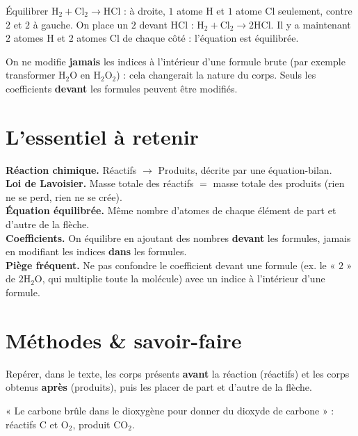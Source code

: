 \begin{exemple}
Équilibrer $\mathrm{H_2}+\mathrm{Cl_2}\to\mathrm{HCl}$ : à droite, $1$ atome H et $1$
atome Cl seulement, contre $2$ et $2$ à gauche. On place un $2$ devant $\mathrm{HCl}$ :
$\mathrm{H_2}+\mathrm{Cl_2}\to2\mathrm{HCl}$. Il y a maintenant $2$ atomes H et $2$ atomes
Cl de chaque côté : l'équation est équilibrée.
\end{exemple}

\begin{remarque}
On ne modifie \textbf{jamais} les indices à l'intérieur d'une formule brute (par exemple
transformer $\mathrm{H_2O}$ en $\mathrm{H_2O_2}$) : cela changerait la nature du corps.
Seuls les coefficients \textbf{devant} les formules peuvent être modifiés.
\end{remarque}

\section{L'essentiel à retenir}

\begin{synthese}
\textbf{Réaction chimique.} Réactifs $\to$ Produits, décrite par une équation-bilan.\\[4pt]
\textbf{Loi de Lavoisier.} Masse totale des réactifs $=$ masse totale des produits (rien
ne se perd, rien ne se crée).\\[4pt]
\textbf{Équation équilibrée.} Même nombre d'atomes de chaque élément de part et d'autre de
la flèche.\\[4pt]
\textbf{Coefficients.} On équilibre en ajoutant des nombres \textbf{devant} les formules,
jamais en modifiant les indices \textbf{dans} les formules.\\[4pt]
\textbf{Piège fréquent.} Ne pas confondre le coefficient devant une formule (ex. le « $2$ »
de $2\mathrm{H_2O}$, qui multiplie toute la molécule) avec un indice à l'intérieur d'une
formule.
\end{synthese}

\section{Méthodes \& savoir-faire}

Repérer, dans le texte, les corps présents \textbf{avant} la réaction (réactifs) et les
corps obtenus \textbf{après} (produits), puis les placer de part et d'autre de la flèche.
\begin{exemple}
« Le carbone brûle dans le dioxygène pour donner du dioxyde de carbone » : réactifs
$\mathrm{C}$ et $\mathrm{O_2}$, produit $\mathrm{CO_2}$.
\end{exemple}

